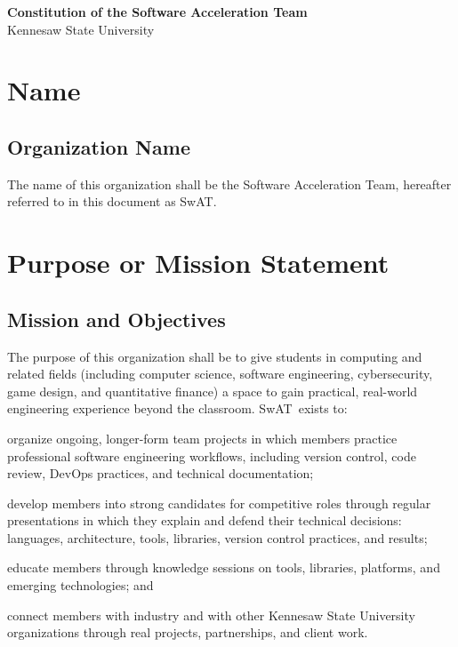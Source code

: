 \documentclass[12pt,letterpaper]{article} %
\newcommand{\org}{Software Acceleration Team}
\newcommand{\orgshort}{SwAT}
\begin{document}
\begin{center}
  {\LARGE\bfseries Constitution of the \org}\\[0.5em]
  {\large Kennesaw State University}
\end{center}

\vspace{1em}

\tableofcontents
\vspace{1em}

\section{Name}\label{art:name} %
\subsection{Organization Name}\label{sec:org-name}
The name of this organization shall be the \org, hereafter referred to in this document as
\orgshort.

\section{Purpose or Mission Statement}\label{art:purpose} %
\subsection{Mission and Objectives}\label{sec:mission}
The purpose of this organization shall be to give students in computing and related fields
(including computer science, software engineering, cybersecurity, game design, and quantitative
finance) a space to gain practical, real-world engineering experience beyond the classroom.
\orgshort\ exists to:
\begin{alphalist}
  \item organize ongoing, longer-form team projects in which members practice professional
  software engineering workflows, including version control, code review, DevOps practices,
  and technical documentation;
  \item develop members into strong candidates for competitive roles through regular
  presentations in which they explain and defend their technical decisions: languages,
  architecture, tools, libraries, version control practices, and results;
  \item educate members through knowledge sessions on tools, libraries, platforms, and
  emerging technologies; and
  \item connect members with industry and with other Kennesaw State University organizations
  through real projects, partnerships, and client work.
\end{alphalist}
\end{document}
